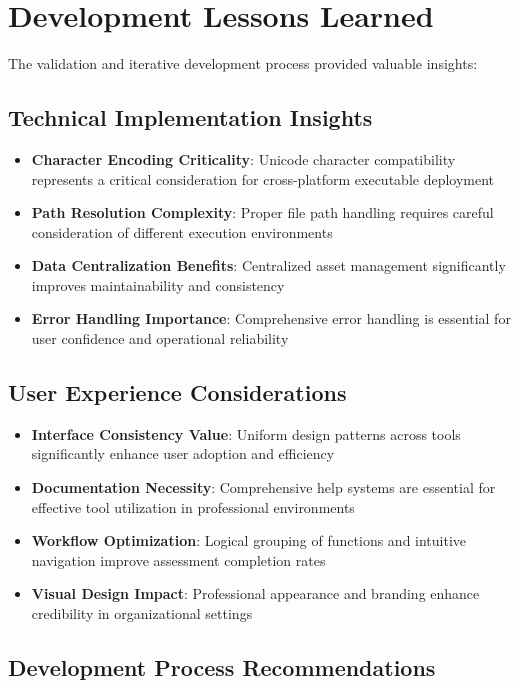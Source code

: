 \documentclass[binding=0.6cm]{sapthesis}
\begin{document}
\section{Development Lessons Learned}

The validation and iterative development process provided valuable insights:

\subsection{Technical Implementation Insights}

\begin{itemize}
    \item \textbf{Character Encoding Criticality}: Unicode character compatibility represents a critical consideration for cross-platform executable deployment
    \item \textbf{Path Resolution Complexity}: Proper file path handling requires careful consideration of different execution environments
    \item \textbf{Data Centralization Benefits}: Centralized asset management significantly improves maintainability and consistency
    \item \textbf{Error Handling Importance}: Comprehensive error handling is essential for user confidence and operational reliability
\end{itemize}

\subsection{User Experience Considerations}

\begin{itemize}
    \item \textbf{Interface Consistency Value}: Uniform design patterns across tools significantly enhance user adoption and efficiency
    \item \textbf{Documentation Necessity}: Comprehensive help systems are essential for effective tool utilization in professional environments
    \item \textbf{Workflow Optimization}: Logical grouping of functions and intuitive navigation improve assessment completion rates
    \item \textbf{Visual Design Impact}: Professional appearance and branding enhance credibility in organizational settings
\end{itemize}

\subsection{Development Process Recommendations}
\end{document}
